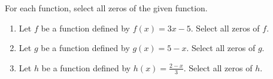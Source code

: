 \documentclass{ximera}
\author{Kenneth Berglund}
\begin{document}
\begin{exercise}
For each function, select all zeros of the given function.
\begin{enumerate}
\item Let $f$ be a function defined by $f(x) = 3x - 5$.
Select all zeros of $f$.
\begin{selectAll}
\end{selectAll}

\item Let $g$ be a function defined by $g(x) = 5 - x$.
Select all zeros of $g$.
\begin{selectAll}
\end{selectAll}

\item Let $h$ be a function defined by $h(x) = \frac{2 - x}{3}$.
Select all zeros of $h$.
\begin{selectAll}
\end{selectAll}

\end{enumerate}

\end{exercise}
\end{document}
